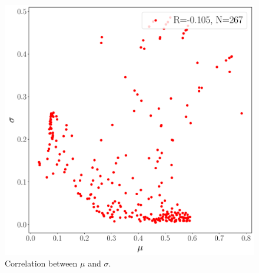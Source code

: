 \documentclass{beamer}
\begin{document}
\begin{frame}
\begin{columns}
\begin{column}{0.5\textwidth}
\begin{figure}
\includegraphics[width=\textwidth]{im/mu_v_sigma_}
\caption{Correlation between $\mu$ and $\sigma$.}
\end{figure}
\end{column}
\end{columns}
\end{frame}
\end{document}

